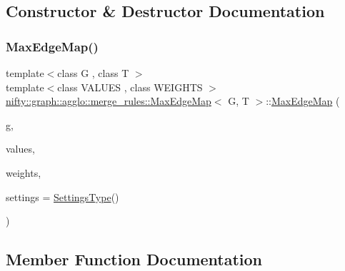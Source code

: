 \subsection{Constructor \& Destructor Documentation}
\mbox{\label{classnifty_1_1graph_1_1agglo_1_1merge__rules_1_1MaxEdgeMap_aa970480b4cf10bb00c507e7d9161feff}} 
\subsubsection{\texorpdfstring{Max\+Edge\+Map()}{MaxEdgeMap()}}
{\footnotesize\ttfamily template$<$class G , class T $>$ \\
template$<$class V\+A\+L\+U\+ES , class W\+E\+I\+G\+H\+TS $>$ \\
\hyperlink{classnifty_1_1graph_1_1agglo_1_1merge__rules_1_1MaxEdgeMap}{nifty\+::graph\+::agglo\+::merge\+\_\+rules\+::\+Max\+Edge\+Map}$<$ G, T $>$\+::\hyperlink{classnifty_1_1graph_1_1agglo_1_1merge__rules_1_1MaxEdgeMap}{Max\+Edge\+Map} (\begin{DoxyParamCaption}\item[{const \hyperlink{classnifty_1_1graph_1_1agglo_1_1merge__rules_1_1MaxEdgeMap_a7b996d3f4737ff2b77cca85520e62510}{Graph\+Type} \&}]{g,  }\item[{const V\+A\+L\+U\+ES \&}]{values,  }\item[{const W\+E\+I\+G\+H\+TS \&}]{weights,  }\item[{const \hyperlink{classnifty_1_1graph_1_1agglo_1_1merge__rules_1_1MaxEdgeMap_a7123769ad8199741d682d9de6be59ca3}{Settings\+Type} \&}]{settings = {\ttfamily \hyperlink{classnifty_1_1graph_1_1agglo_1_1merge__rules_1_1MaxEdgeMap_a7123769ad8199741d682d9de6be59ca3}{Settings\+Type}()} }\end{DoxyParamCaption})\hspace{0.3cm}{\ttfamily [inline]}}



\subsection{Member Function Documentation}
\mbox{\label{classnifty_1_1graph_1_1agglo_1_1merge__rules_1_1MaxEdgeMap_a924065ef7a925db0fcd7126c5c4c5847}} 
